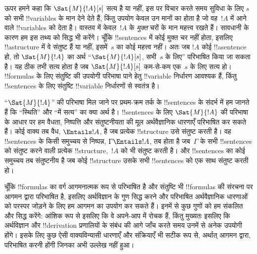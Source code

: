 \documentclass[../../../include/open-logic-section]{subfiles}
\begin{document}


ऊपर हमने कहा कि $\Sat{M}{!A}[s]$ सत्य है या नहीं, इस पर विचार करते समय
सुविधा के लिए $s$ को सभी !!{variable}s के मान देने देते हैं, किंतु उपयोग
केवल उन मानों का होता है जो वह~$!A$ में आने वाले !!{variable}s को देता है।
वास्तव में केवल~$!A$ के \emph{मुक्त} चरों के मान महत्त्व रखते हैं। सावधानी
के कारण हम इस तथ्य को सिद्ध भी करेंगे। चूँकि !!{sentence}s में कोई मुक्त चर
नहीं होता, इसलिए !!a{structure} में वे संतुष्ट हैं या नहीं, इसमें~$s$ का कोई
महत्त्व नहीं। अतः जब $!A$ कोई !!a{sentence} हो, तो $\Sat{M}{!A}$ का अर्थ
``$\Sat{M}{!A}[s]$, सभी~$s$ के लिए'' परिभाषित किया जा सकता है। यह ठीक तभी
सत्य होता है जब $\Sat{M}{!A}[s]$ कम-से-कम एक~$s$ के लिए सत्य हो।
!!{formula}s के लिए संतुष्टि की उपयोगी परिभाषा पाने हेतु !!{variable}
निर्धारण आवश्यक हैं, किंतु !!{sentence}s के लिए संतुष्टि !!{variable}
निर्धारणों से स्वतंत्र है।

``$\Sat{M}{!A}$'' की परिभाषा मिल जाने पर प्रथम-क्रम तर्क के !!{sentence}s
के संदर्भ में हम जानते हैं कि ``स्थिति'' और ``में सत्य'' का क्या अर्थ है।
!!{sentence}s के लिए $\Sat{M}{!A}$ की परिभाषा के आधार पर हम वैधता, निष्पत्ति
और संतुष्टनीयता की मूल अर्थवैज्ञानिक धारणाएँ परिभाषित कर सकते हैं। कोई वाक्य
तब वैध, $\Entails !A$, है जब प्रत्येक !!{structure} उसे संतुष्ट करती है। वह
!!{sentence}s के किसी समुच्चय से निष्पन्न, $\Gamma \Entails !A$, तब होता है
जब~$\Gamma$ के सभी !!{sentence}s को संतुष्ट करने वाली प्रत्येक
!!{structure},~$!A$ को भी संतुष्ट करती है। और !!{sentence}s का कोई समुच्चय तब
संतुष्टनीय है जब कोई !!{structure} उसके सभी !!{sentence}s को एक साथ संतुष्ट
करती हो।

चूँकि !!{formula}s का वर्ग आगमनात्मक रूप से परिभाषित है और संतुष्टि भी !!{formula}s
की संरचना पर आगमन द्वारा परिभाषित है, इसलिए अर्थविज्ञान के गुण सिद्ध करने और
परिभाषित अर्थवैज्ञानिक धारणाओं को परस्पर जोड़ने के लिए हम आगमन का उपयोग कर
सकते हैं। इनमें से कुछ गुणों को हम संकलित और सिद्ध करेंगे: आंशिक रूप से इसलिए
कि वे अपने-आप में रोचक हैं, किंतु मुख्यतः इसलिए कि अर्थविज्ञान और
!!{derivation} प्रणालियों के संबंध की आगे जाँच करते समय उनमें से अनेक उपयोगी
होंगे। इसके लिए कुछ ऐसी वाक्यविन्यासी धारणाएँ और संक्रियाएँ भी सटीक रूप से,
अर्थात् आगमन द्वारा, परिभाषित करनी होंगी जिनका अभी उल्लेख नहीं हुआ।
\end{document}

